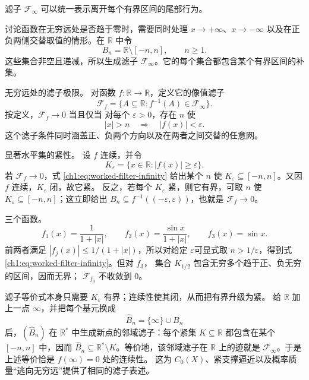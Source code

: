 滤子 $\mathcal F_\infty$ 可以统一表示离开每个有界区间的尾部行为。

\begin{example}[无穷远滤子与紧水平集]
\label{ch1:exa:worked-filter-at-infinity}
讨论函数在无穷远处是否趋于零时，需要同时处理 $x\to+\infty$、$x\to-\infty$
以及在正负两侧交替取值的情形。在
$\mathbb R$ 中令
\[
 B_n=\mathbb R\setminus[-n,n],
 \qquad n\geq1.
\]
这些集合非空且递减，所以生成滤子 $\mathcal F_\infty$。它的每个集合都包含某个有界区间的补集。

\medskip
\noindent 无穷远处的滤子极限。
对函数 $f:\mathbb R\to\mathbb R$，定义它的像值滤子
\[
 \mathcal F_f=
 \{A\subseteq\mathbb R:f^{-1}(A)\in\mathcal F_\infty\}.
\]
按定义，$\mathcal F_f\to0$ 当且仅当
对每个 $\varepsilon>0$，存在 $n$ 使
\begin{equation}
 |x|>n\quad\Longrightarrow\quad |f(x)|<\varepsilon.
 \label{ch1:eq:worked-filter-infinity}
\end{equation}
这个滤子条件同时涵盖正、负两个方向以及在两者之间交替的任意网。

\medskip
\noindent 显著水平集的紧性。
设 $f$ 连续，并令
\[
 K_\varepsilon=\{x\in\mathbb R:|f(x)|\geq\varepsilon\}.
\]
若 $\mathcal F_f\to0$，式 \eqref{ch1:eq:worked-filter-infinity} 给出某个 $n$ 使
$K_\varepsilon\subseteq[-n,n]$。又因 $f$ 连续，$K_\varepsilon$ 闭，故它紧。
反之，若每个 $K_\varepsilon$ 紧，则它有界，可取 $n$ 使
$K_\varepsilon\subseteq[-n,n]$；这立即给出
$B_n\subseteq f^{-1}((-\varepsilon,\varepsilon))$，也就是
$\mathcal F_f\to0$。

\medskip
\noindent 三个函数。
\[
 f_1(x)=\frac1{1+|x|},
 \qquad
 f_2(x)=\frac{\sin x}{1+|x|},
 \qquad
 f_3(x)=\sin x.
\]
前两者满足 $|f_j(x)|\leq1/(1+|x|)$，所以对给定 $\varepsilon$可显式取
$n>1/\varepsilon$，得到式 \eqref{ch1:eq:worked-filter-infinity}。但对 $f_3$，
集合 $K_{1/2}$ 包含无穷多个趋于正、负无穷的区间，因而无界；
$\mathcal F_{f_3}$ 不收敛到 $0$。

\medskip
滤子等价式本身只需要 $K_\varepsilon$ 有界；连续性使其闭，从而把有界升级为紧。
给 $\mathbb R$ 加上一点 $\infty$，并把每个基元换成
\[
 \widehat B_n=\{\infty\}\cup B_n
\]
后，$(\widehat B_n)$ 在 $\mathbb R^*$ 中生成新点的邻域滤子：每个紧集
$K\subseteq\mathbb R$ 都包含在某个 $[-n,n]$ 中，因而
$\widehat B_n\subseteq\mathbb R^*\setminus K$。等价地，该邻域滤子在
$\mathbb R$ 上的迹就是 $\mathcal F_\infty$。于是上述等价恰是
$f(\infty)=0$ 处的连续性。
这为 $C_0(X)$、紧支撑逼近以及概率质量“逃向无穷远”提供了相同的滤子表述。
\end{example}

